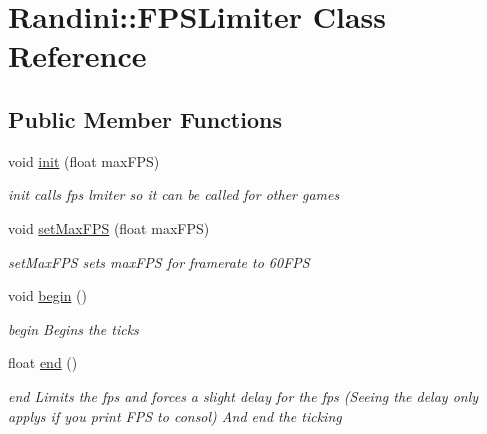 \hypertarget{classRandini_1_1FPSLimiter}{
\section{Randini::FPSLimiter Class Reference}
\label{classRandini_1_1FPSLimiter}
}
\subsection*{Public Member Functions}
\begin{DoxyCompactItemize}
\item 
void \hyperlink{classRandini_1_1FPSLimiter_a3024a959139c6a9b2d2c583200d69a0c}{init} (float maxFPS)
\begin{DoxyCompactList}\small\item\em init calls fps lmiter so it can be called for other games \item\end{DoxyCompactList}\item 
void \hyperlink{classRandini_1_1FPSLimiter_ab791c46a558dc4f7dfca408f92563bf5}{setMaxFPS} (float maxFPS)
\begin{DoxyCompactList}\small\item\em setMaxFPS sets maxFPS for framerate to 60FPS \item\end{DoxyCompactList}\item 
\hypertarget{classRandini_1_1FPSLimiter_ab3c41c74d451ebdcba9f448fd60efeaa}{
void \hyperlink{classRandini_1_1FPSLimiter_ab3c41c74d451ebdcba9f448fd60efeaa}{begin} ()}
\label{classRandini_1_1FPSLimiter_ab3c41c74d451ebdcba9f448fd60efeaa}

\begin{DoxyCompactList}\small\item\em begin Begins the ticks \item\end{DoxyCompactList}\item 
float \hyperlink{classRandini_1_1FPSLimiter_adde6384240089bf3e87ce5d5dc114c60}{end} ()
\begin{DoxyCompactList}\small\item\em end Limits the fps and forces a slight delay for the fps (Seeing the delay only applys if you print FPS to consol) And end the ticking \item\end{DoxyCompactList}\end{DoxyCompactItemize}


